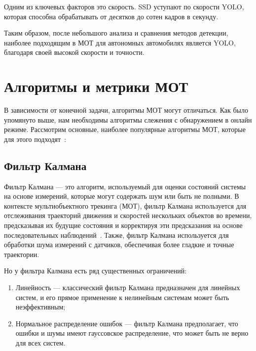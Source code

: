 
Одним из ключевых факторов это скорость. SSD уступают по скорости YOLO, которая способна обрабатывать от десятков до сотен кадров в секунду. 

Таким образом, после небольшого анализа и сравнения методов детекции, наиболее подходящим  в МОТ для автономных автомобилях является YOLO, благодаря своей высокой скорости и точности.



\section{Алгоритмы и метрики МОТ}
В зависимости от конечной задачи, алгоритмы МОТ могут отличаться. Как было упомянуто выше, нам  необходимы алгоритмы слежения с обнаружением в онлайн режиме. Рассмотрим основные, наиболее популярные алгоритмы МОТ, которые для этого подходят~\cite{Article::Luo2021}:

\subsection{Фильтр Калмана}
	
Фильтр Калмана ---  это алгоритм, используемый для оценки состояний системы на основе измерений, которые могут содержать шум или быть не полными. В контексте мультиобъектного трекинга (МОТ), фильтр Калмана используется для отслеживания траекторий движения и скоростей нескольких объектов во времени, предсказывая их будущие состояния и корректируя эти предсказания на основе последовательных наблюдений~\cite{Rodriguez2011}. Также, фильтр Калмана используется для обработки шума измерений с датчиков, обеспечивая более гладкие и точные траектории.

Но у фильтра Калмана есть ряд существенных ограничений: 

\begin{enumerate}

	\item Линейность --- классический фильтр Калмана предназначен для линейных систем, и его прямое применение к нелинейным системам может быть неэффективным;
	
	\item Нормальное распределение ошибок --- фильтр Калмана предполагает, что ошибки и шумы имеют гауссовское распределение, что может быть не верно для всех систем.
	
\end{enumerate}

